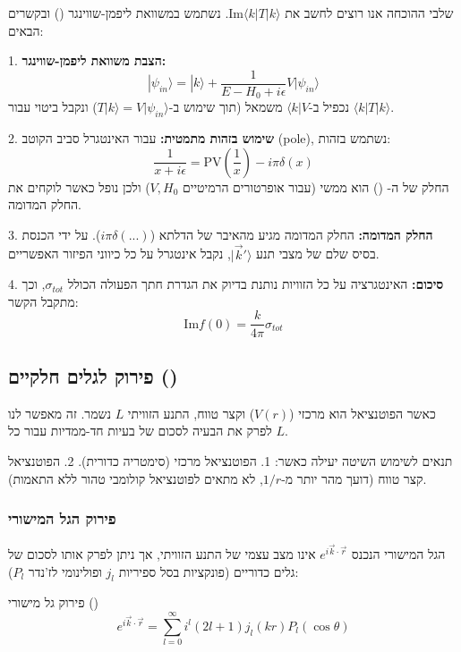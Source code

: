 \begin{mainbox}{שלבי ההוכחה}
אנו רוצים לחשב את $\text{Im}\langle k|T|k\rangle$. נשתמש במשוואת ליפמן-שווינגר () ובקשרים הבאים:

1. \textbf{הצבת משוואת ליפמן-שווינגר:}
   \[
   |\psi_{in}\rangle = |k\rangle + \frac{1}{E - H_0 + i\epsilon} V |\psi_{in}\rangle
   \]
   נכפיל ב-$\langle k|V$ משמאל (תוך שימוש ב-$T|k\rangle=V|\psi_{in}\rangle$) ונקבל ביטוי עבור $\langle k|T|k\rangle$.

2. \textbf{שימוש בזהות מתמטית:}
   עבור האינטגרל סביב הקוטב (pole), נשתמש בזהות:
   \[
   \frac{1}{x + i\epsilon} = \text{PV}\left(\frac{1}{x}\right) - i\pi \delta(x)
   \]
   החלק של ה- () הוא ממשי (עבור אופרטורים הרמיטיים $V, H_0$) ולכן נופל כאשר לוקחים את החלק המדומה.

3. \textbf{החלק המדומה:}
   החלק המדומה מגיע מהאיבר של הדלתא ($i\pi \delta(...)$). על ידי הכנסת בסיס שלם של מצבי תנע $|\vec{k}'\rangle$, נקבל אינטגרל על כל כיווני הפיזור האפשריים.

4. \textbf{סיכום:}
   האינטגרציה על כל הזוויות נותנת בדיוק את הגדרת חתך הפעולה הכולל $\sigma_{tot}$, וכך מתקבל הקשר:
   \[
   \text{Im} f(0) = \frac{k}{4\pi} \sigma_{tot}
   \]
\end{mainbox}

\subsection{פירוק לגלים חלקיים ()}

כאשר הפוטנציאל הוא מרכזי ($V(r)$) וקצר טווח, התנע הזוויתי $L$ נשמר. זה מאפשר לנו לפרק את הבעיה לסכום של בעיות חד-ממדיות עבור כל $L$.

\begin{importantbox}{תנאים לשימוש}
השיטה יעילה כאשר:
1. הפוטנציאל מרכזי (סימטריה כדורית).
2. הפוטנציאל קצר טווח (דועך מהר יותר מ-$1/r$, לא מתאים לפוטנציאל קולומבי טהור ללא התאמות).
\end{importantbox}

\subsubsection{פירוק הגל המישורי}
הגל המישורי הנכנס $e^{i\vec{k}\cdot\vec{r}}$ אינו מצב עצמי של התנע הזוויתי, אך ניתן לפרק אותו לסכום של גלים כדוריים (פונקציות בסל ספיריות $j_l$ ופולינומי לז'נדר $P_l$):

\begin{formulabox}{פירוק גל מישורי ()}
\[
e^{i\vec{k}\cdot\vec{r}} = \sum_{l=0}^{\infty} i^l (2l+1) j_l(kr) P_l(\cos\theta)
\]
\end{formulabox}

